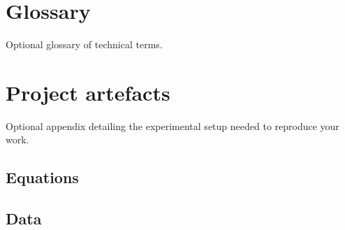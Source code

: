 
\chapter{Glossary}
Optional glossary of technical terms.

\chapter{Project artefacts}
Optional appendix detailing the experimental setup needed to reproduce your work. 
\section{Equations}

\section{Data}
